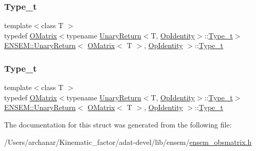 \subsubsection{\texorpdfstring{Type\_t}{Type\_t}\hspace{0.1cm}{\footnotesize\ttfamily [2/3]}}
{\footnotesize\ttfamily template$<$class T $>$ \\
typedef \mbox{\hyperlink{classENSEM_1_1OMatrix}{O\+Matrix}}$<$typename \mbox{\hyperlink{structENSEM_1_1UnaryReturn}{Unary\+Return}}$<$T, \mbox{\hyperlink{structENSEM_1_1OpIdentity}{Op\+Identity}}$>$\+::\mbox{\hyperlink{structENSEM_1_1UnaryReturn_3_01OMatrix_3_01T_01_4_00_01OpIdentity_01_4_a7f4dcdf040c4857ee984e5fbf4813fc6}{Type\+\_\+t}}$>$ \mbox{\hyperlink{structENSEM_1_1UnaryReturn}{E\+N\+S\+E\+M\+::\+Unary\+Return}}$<$ \mbox{\hyperlink{classENSEM_1_1OMatrix}{O\+Matrix}}$<$ T $>$, \mbox{\hyperlink{structENSEM_1_1OpIdentity}{Op\+Identity}} $>$\+::\mbox{\hyperlink{structENSEM_1_1UnaryReturn_3_01OMatrix_3_01T_01_4_00_01OpIdentity_01_4_a7f4dcdf040c4857ee984e5fbf4813fc6}{Type\+\_\+t}}}

\mbox{\label{structENSEM_1_1UnaryReturn_3_01OMatrix_3_01T_01_4_00_01OpIdentity_01_4_a7f4dcdf040c4857ee984e5fbf4813fc6}} 
\subsubsection{\texorpdfstring{Type\_t}{Type\_t}\hspace{0.1cm}{\footnotesize\ttfamily [3/3]}}
{\footnotesize\ttfamily template$<$class T $>$ \\
typedef \mbox{\hyperlink{classENSEM_1_1OMatrix}{O\+Matrix}}$<$typename \mbox{\hyperlink{structENSEM_1_1UnaryReturn}{Unary\+Return}}$<$T, \mbox{\hyperlink{structENSEM_1_1OpIdentity}{Op\+Identity}}$>$\+::\mbox{\hyperlink{structENSEM_1_1UnaryReturn_3_01OMatrix_3_01T_01_4_00_01OpIdentity_01_4_a7f4dcdf040c4857ee984e5fbf4813fc6}{Type\+\_\+t}}$>$ \mbox{\hyperlink{structENSEM_1_1UnaryReturn}{E\+N\+S\+E\+M\+::\+Unary\+Return}}$<$ \mbox{\hyperlink{classENSEM_1_1OMatrix}{O\+Matrix}}$<$ T $>$, \mbox{\hyperlink{structENSEM_1_1OpIdentity}{Op\+Identity}} $>$\+::\mbox{\hyperlink{structENSEM_1_1UnaryReturn_3_01OMatrix_3_01T_01_4_00_01OpIdentity_01_4_a7f4dcdf040c4857ee984e5fbf4813fc6}{Type\+\_\+t}}}



The documentation for this struct was generated from the following file\+:\begin{DoxyCompactItemize}
\item 
/\+Users/archanar/\+Kinematic\+\_\+factor/adat-\/devel/lib/ensem/\mbox{\hyperlink{adat-devel_2lib_2ensem_2ensem__obsmatrix_8h}{ensem\+\_\+obsmatrix.\+h}}\end{DoxyCompactItemize}

